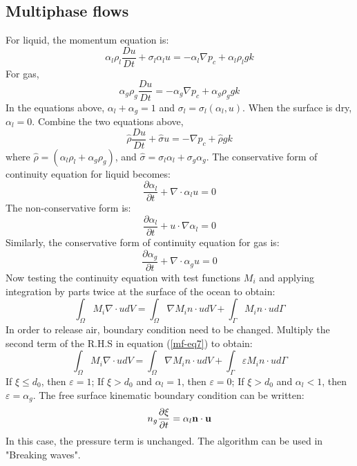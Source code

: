 \subsection{Multiphase flows}
\noindent
For liquid, the momentum equation is:
\begin{equation}
\alpha_l\rho_l\dfrac{Du}{Dt} + \sigma_l\alpha_l u = - \alpha_l\nabla p_c + \alpha_l\rho_l g k
\label{mf-eq1}
\end{equation}
For gas,
\begin{equation}
\alpha_g\rho_g\dfrac{Du}{Dt} = - \alpha_g\nabla p_c + \alpha_g\rho_ggk
\label{mf-eq2}
\end{equation}
In the equations above, $ \alpha_l + \alpha_g =1$ and $\sigma_l=\sigma_l(\alpha_l,u)$. When the surface is dry, $\alpha_l = 0$. Combine the two equations above,
\begin{equation}
\hat \rho \dfrac{Du}{Dt} + \hat \sigma u = -\nabla p_c+\hat \rho g k
\label{mf-eq3}
\end{equation}
where $\hat \rho=(\alpha_l\rho_l + \alpha_g\rho_g)$, and $\hat\sigma=\sigma_l\alpha_l +\sigma_g\alpha_g $.
The conservative form of continuity equation for liquid becomes:
\begin{equation}
\frac{\partial \alpha_l}{\partial t} + \nabla \cdot \alpha_l u = 0
\label{mf-eq4}
\end{equation}
The non-conservative form is:
\begin{equation}
\frac{\partial \alpha_l}{\partial t} + u \cdot \nabla \alpha_l = 0
\label{mf-eq5}
\end{equation}
Similarly, the conservative form of continuity equation for gas is:
\begin{equation}
\frac{\partial \alpha_g}{\partial t} + \nabla \cdot \alpha_g u = 0
\label{mf-eq6}
\end{equation}
Now testing the continuity equation with test functions $M_i$ and applying integration by parts twice at the 
surface of the ocean to obtain:
\begin{equation}
\int_\Omega M_i \nabla \cdot u dV = \int_\Omega \nabla M_i n \cdot u dV + \int_\Gamma M_i n \cdot u d\Gamma
\label{mf-eq7}
\end{equation}
In order to release air, boundary condition need to be changed. Multiply the second term of the R.H.S in 
equation (\ref{mf-eq7}) to obtain:
\begin{equation}
\int_\Omega M_i \nabla \cdot u dV = \int_\Omega \nabla M_i n \cdot u dV +
 \int_\Gamma \varepsilon M_i n \cdot u d\Gamma
\label{mf-eq8}
\end{equation}    
If $\xi \leq d_0$, then $\varepsilon = 1$;
If $\xi > d_0$ and $\alpha_l = 1$, then $\varepsilon = 0$;
If $\xi > d_0$ and $\alpha_l < 1$, then $\varepsilon = \alpha_g$.
The free surface kinematic boundary condition can be written:
\begin{equation}
n_g\frac {\partial \xi}{\partial t} = \alpha_l {\bf n} \cdot {\bf u}
\label{mf-eq9}
\end{equation} 
In this case, the pressure term is unchanged. The algorithm can be used in "Breaking waves".




